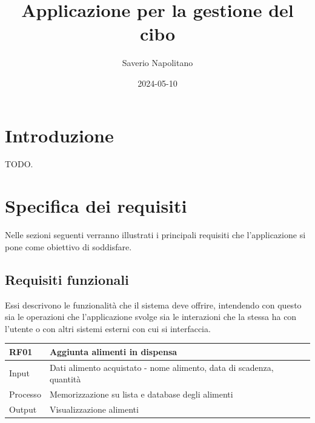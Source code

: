 \documentclass{article}
\title{Applicazione per la gestione del cibo}
\date{2024-05-10}
\author{Saverio Napolitano}
\begin{document}
\maketitle


\tableofcontents

\newpage


\section{Introduzione}

TODO.

\section{Specifica dei requisiti}

Nelle sezioni seguenti verranno illustrati i principali requisiti che l'applicazione si pone come obiettivo di soddisfare.

\subsection{Requisiti funzionali}

Essi descrivono le funzionalità che il sistema deve offrire, intendendo con questo sia le operazioni che l'applicazione svolge sia le interazioni che la stessa ha con l'utente o con altri sistemi esterni con cui si interfaccia.

\begin{table}[H]
    \begin{flushleft}
      \begin{tabular}{l|l}
        \toprule
        \textbf{RF01} & \textbf{Aggiunta alimenti in dispensa}\\
        \midrule
        Input & Dati alimento acquistato - nome alimento, data di scadenza, quantità\\
        Processo & Memorizzazione su lista e database degli alimenti\\
        Output & Visualizzazione alimenti\\
        \bottomrule
      \end{tabular}
    \end{flushleft}
\end{table}
\end{document}

